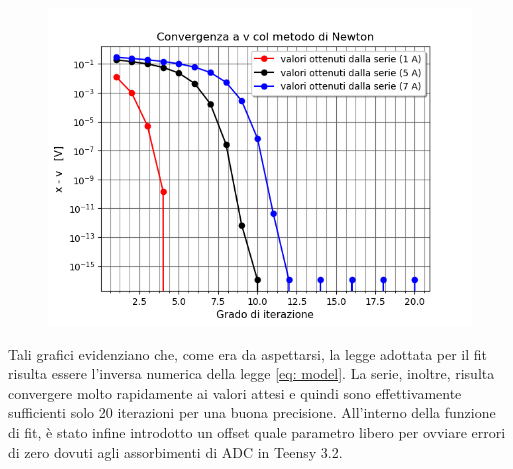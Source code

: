 \documentclass{article}[a4paper, oneside, 11pt]
\begin{document}
\begin{figure}[H]
	\centering 
 		\includegraphics[scale=0.75]{./Figura3_appendiceB.png}
\end{figure}

Tali grafici evidenziano che, come era da aspettarsi, la legge adottata per il 
fit risulta essere l’inversa numerica della legge \eqref{eq: model}. La serie, inoltre, 
risulta convergere molto rapidamente ai valori attesi e quindi sono 
effettivamente sufficienti solo 20 iterazioni per una buona precisione.
All’interno della funzione di fit, è stato infine introdotto un offset quale parametro
libero per ovviare errori di zero dovuti agli assorbimenti di ADC in Teensy 3.2.


\medskip


\end{document}
